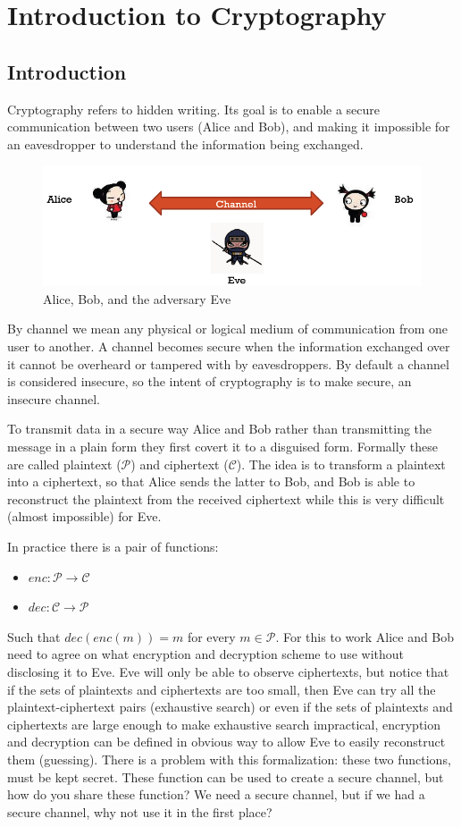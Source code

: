 \chapter{Introduction to Cryptography}

\section{Introduction}
Cryptography refers to hidden writing. Its goal is to enable a secure communication between two users (Alice and Bob), and making it impossible for an eavesdropper to understand the information being exchanged.

\begin{figure}
	\centering
	\includegraphics[width=0.7\linewidth]{Images/Chapter1/screenshot000}
	\caption{Alice, Bob, and the adversary Eve}
	\label{fig:chapter1_screenshot000}
\end{figure}

By channel we mean any physical or logical medium of communication from one user to another. A channel becomes secure when the information exchanged over it cannot be overheard or tampered with by eavesdroppers. By default a channel is considered insecure, so the intent of cryptography is to make secure, an insecure channel.

To transmit data in a secure way Alice and Bob rather than transmitting the message in a plain form they first covert it to a disguised form. Formally these are called plaintext ($\mathcal{P}$) and ciphertext ($\mathcal{C}$). The idea is to transform a plaintext into a ciphertext, so that Alice sends the latter to Bob, and Bob is able to reconstruct the plaintext from the received ciphertext while this is very difficult (almost impossible) for Eve.

In practice there is a pair of functions:
\begin{itemize}
	\item $enc: \mathcal{P \rightarrow C}$
	\item $dec: \mathcal{C \rightarrow P}$
\end{itemize}
Such that $dec(enc(m)) = m$ for every $m\in\mathcal{P}$.
For this to work Alice and Bob need to agree on what encryption and decryption scheme to use without disclosing it to Eve. Eve will only be able to observe ciphertexts, but notice that if the sets of plaintexts and ciphertexts are too small, then Eve can try all the plaintext-ciphertext pairs (exhaustive search) or even if the sets of plaintexts and ciphertexts are large enough to make exhaustive search impractical, encryption and decryption can be defined in obvious way to allow Eve to easily reconstruct them (guessing).
There is a problem with this formalization: these two functions, must be kept secret. These function can be used to create a secure channel, but how do you share these function? We need a secure channel, but if we had a secure channel, why not use it in the first place?

